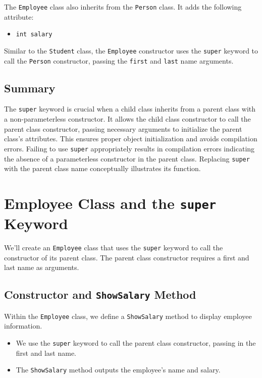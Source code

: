 \documentclass{article}
\begin{document}
The \texttt{Employee} class also inherits from the \texttt{Person} class. It adds the following attribute:

\begin{itemize}
    \item \texttt{int salary}
\end{itemize}

Similar to the \texttt{Student} class, the \texttt{Employee} constructor uses the \texttt{super} keyword to call the \texttt{Person} constructor, passing the \texttt{first} and \texttt{last} name arguments.


\subsection{Summary}

The \texttt{super} keyword is crucial when a child class inherits from a parent class with a non-parameterless constructor.  It allows the child class constructor to call the parent class constructor, passing necessary arguments to initialize the parent class's attributes.  This ensures proper object initialization and avoids compilation errors.  Failing to use \texttt{super} appropriately results in compilation errors indicating the absence of a parameterless constructor in the parent class.  Replacing \texttt{super} with the parent class name conceptually illustrates its function.


\section{Employee Class and the \texttt{super} Keyword}

We'll create an \texttt{Employee} class that uses the \texttt{super} keyword to call the constructor of its parent class.  The parent class constructor requires a first and last name as arguments.

\subsection{Constructor and \texttt{ShowSalary} Method}

Within the \texttt{Employee} class, we define a \texttt{ShowSalary} method to display employee information.

\begin{itemize}
    \item We use the \texttt{super} keyword to call the parent class constructor, passing in the first and last name.
    \item The \texttt{ShowSalary} method outputs the employee's name and salary.
\end{itemize}
\end{document}
